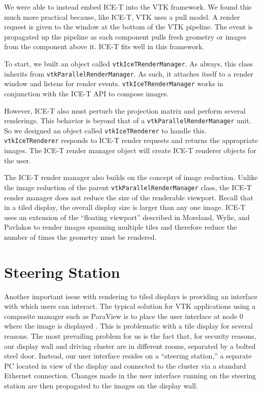 \documentclass[twocolumn]{article}
\newcommand{\cidentifier}[1]{\texttt{#1}}
\begin{document}
  We were able to instead embed ICE-T into the VTK framework.  We found
  this much more practical because, like ICE-T, VTK uses a pull model.  A
  render request is given to the window at the bottom of the VTK pipeline.
  The event is propagated up the pipeline as each component pulls fresh
  geometry or images from the component above it.  ICE-T fits well in this
  framework.

  To start, we built an object called
  \cidentifier{vtk\-Ice\-T\-Render\-Manager}.  As always, this class
  inherits from \cidentifier{vtk\-Parallel\-Render\-Manager}.  As such, it
  attaches itself to a render window and listens for render events.
  \cidentifier{vtk\-Ice\-T\-Render\-Manager} works in conjunction with the
  ICE-T API to compose images.

  However, ICE-T also must perturb the projection matrix and perform
  several renderings.  This behavior is beyond that of a
  \cidentifier{vtk\-Parallel\-Render\-Manager} unit.  So we designed an
  object called \cidentifier{vtk\-Ice\-T\-Renderer} to handle this.
  \cidentifier{vtk\-Ice\-T\-Renderer} responds to ICE-T render requests and
  returns the appropriate images.  The ICE-T render manager object will
  create ICE-T renderer objects for the user.

  The ICE-T render manager also builds on the concept of image reduction.
  Unlike the image reduction of the parent
  \cidentifier{vtk\-Parallel\-Render\-Manager} class, the ICE-T render
  manager does not reduce the size of the renderable viewport.  Recall that
  in a tiled display, the overall display size is larger than any one
  image.  ICE-T uses an extension of the ``floating viewport'' described in
  Moreland, Wylie, and Pavlakos \cite{Moreland01} to render images spanning
  multiple tiles and therefore reduce the number of times the geometry must
  be rendered.


  \section{Steering Station}
  \label{sec:steering_station}

  Another important issue with rendering to tiled displays is providing an
  interface with which users can interact.  The typical solution for VTK
  applications using a composite manager such as ParaView is to place the
  user interface at node 0 where the image is displayed \cite{Law01}.  This
  is problematic with a tile display for several reasons.  The most
  prevailing problem for us is the fact that, for security reasons, our
  display wall and driving cluster are in different rooms, separated by a
  bolted steel door.  Instead, our user interface resides on a ``steering
  station,'' a separate PC located in view of the display and connected to
  the cluster via a standard Ethernet connection.  Changes made in the user
  interface running on the steering station are then propagated to the
  images on the display wall.
\end{document}
